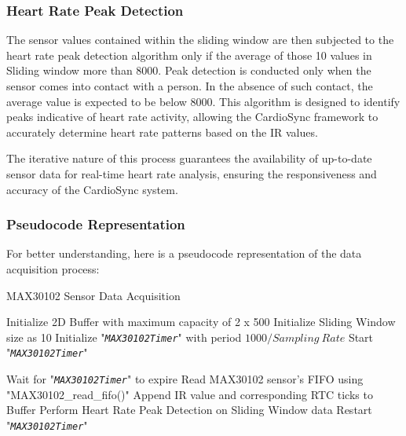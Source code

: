 \subsubsection{Heart Rate Peak Detection}
The sensor values contained within the sliding window are then subjected to the heart rate peak detection algorithm only if the average of those 10 values in Sliding window more than 8000. Peak detection is conducted only when the sensor comes into contact with a person. In the absence of such contact, the average value is expected to be below 8000. This algorithm is designed to identify peaks indicative of heart rate activity, allowing the CardioSync framework to accurately determine heart rate patterns based on the IR values.

\noindent The iterative nature of this process guarantees the availability of up-to-date sensor data for real-time heart rate analysis, ensuring the responsiveness and accuracy of the CardioSync system.

\subsubsection{Pseudocode Representation}
For better understanding, here is a pseudocode representation of the data acquisition process:

\begin{algorithm}[H]
\caption{MAX30102 Sensor Data Acquisition}
\begin{algorithmic}[1]

\State Initialize 2D Buffer with maximum capacity of 2 x 500
\State Initialize Sliding Window size as 10
\State Initialize "\textit{\texttt{MAX30102Timer}}" with period \(1000 / Sampling\ Rate\)
\State Start "\textit{\texttt{MAX30102Timer}}"

\State Wait for "\textit{\texttt{MAX30102Timer}}" to expire
    \State Read MAX30102 sensor's FIFO using "MAX30102\_read\_fifo()"
    \State Append IR value and corresponding RTC ticks to Buffer
        \State Perform Heart Rate Peak Detection on Sliding Window data
    \EndIf
    \State Restart "\textit{\texttt{MAX30102Timer}}"
\EndIf

\end{algorithmic}
\end{algorithm}

